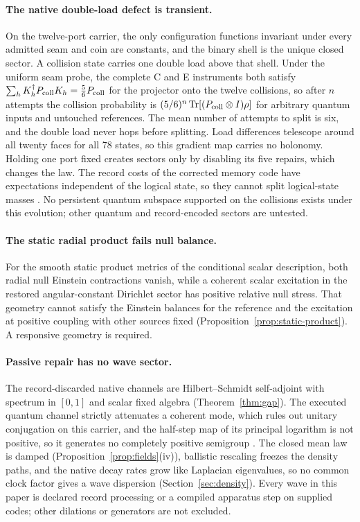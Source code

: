 \documentclass[11pt]{article}
\theoremstyle{definition}
\theoremstyle{remark}
\theoremstyle{plain}
\newcommand{\Tr}{\operatorname{Tr}}
\begin{document}
\paragraph{The native double-load defect is transient.} On the twelve-port
carrier, the only configuration functions invariant under every admitted
seam and coin are constants, and the binary shell is the unique closed
sector. A collision state carries one double load above that shell. Under
the uniform seam probe, the complete C and E instruments both satisfy
$\sum_hK_h^\dagger P_{\rm coll}K_h=\frac56P_{\rm coll}$ for the projector onto
the twelve collisions, so after $n$ attempts the collision probability is
$(5/6)^n\Tr[(P_{\rm coll}\otimes I)\rho]$ for arbitrary quantum inputs and
untouched references. The mean number of attempts to split is six, and the
double load never hops before splitting. Load differences telescope around
all twenty faces for all 78 states, so this gradient map carries no
holonomy. Holding one port fixed creates sectors only by disabling its five
repairs, which changes the law. The record costs of the corrected memory code
have expectations independent of the logical state, so they cannot split
logical-state masses \cite{nativeDefect}. No persistent quantum subspace
supported on the collisions exists under this evolution; other quantum and
record-encoded sectors are untested.

\paragraph{The static radial product fails null balance.} For the smooth
static product metrics of the conditional scalar description, both radial
null Einstein contractions vanish, while a coherent scalar excitation in the
restored angular-constant Dirichlet sector has positive relative null
stress. That geometry cannot satisfy the Einstein balances for the reference
and the excitation at positive coupling with other sources fixed
(Proposition~\ref{prop:static-product}). A responsive geometry is required.

\paragraph{Passive repair has no wave sector.} The record-discarded native
channels are Hilbert--Schmidt self-adjoint with spectrum in $[0,1]$ and
scalar fixed algebra (Theorem~\ref{thm:gap}). The executed quantum channel
strictly attenuates a coherent mode, which rules out unitary conjugation on
this carrier, and the half-step map of its principal logarithm is not
positive, so it generates no completely positive semigroup \cite{mREADME}.
The closed mean law is damped (Proposition~\ref{prop:fields}(iv)), ballistic
rescaling freezes the density paths, and the native decay rates grow like
Laplacian eigenvalues, so no common clock factor gives a wave dispersion
(Section~\ref{sec:density}). Every wave in this paper is declared record
processing or a compiled apparatus step on supplied codes; other dilations
or generators are not excluded.
\end{document}

